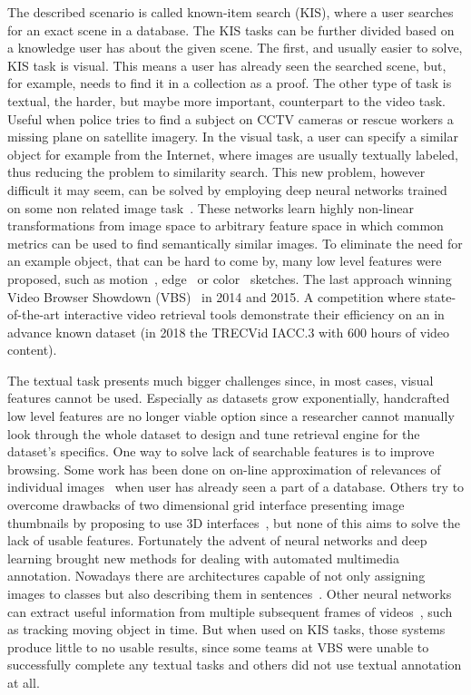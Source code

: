 The described scenario is called known-item search (KIS), where a user searches for an exact scene in a database. The KIS tasks can be further divided based on a knowledge user has about the given scene. The first, and usually easier to solve, KIS task is visual. This means a user has already seen the searched scene, but, for example, needs to find it in a collection as a proof. The other type of task is textual, the harder, but maybe more important, counterpart to the video task. Useful when police tries to find a subject on CCTV cameras or rescue workers a missing plane on satellite imagery. In the visual task, a user can specify a similar object for example from the Internet, where images are usually textually labeled, thus reducing the problem to similarity search. This new problem, however difficult it may seem, can be solved by employing deep neural networks trained on some non related image task~\cite{deepFeatures}. These networks learn highly non-linear transformations from image space to arbitrary feature space in which common metrics can be used to find semantically similar images.
To eliminate the need for an example object, that can be hard to come by, many low level features were proposed, such as motion~\cite{motionSketch}, edge~\cite{eitz2009descriptor} or color~\cite{sigBrowser} sketches. The last approach winning Video Browser Showdown (VBS)~\cite{cobarzan2017interactive} in 2014 and 2015. A competition where state-of-the-art interactive video retrieval tools demonstrate their efficiency on an in advance known dataset (in 2018 the TRECVid IACC.3 with 600 hours of video content).

The textual task presents much bigger challenges since, in most cases, visual features cannot be used. Especially as datasets grow exponentially, handcrafted low level features are no longer viable option since a researcher cannot manually look through the whole dataset to design and tune retrieval engine for the dataset's specifics. One way to solve lack of searchable features is to improve browsing. Some work has been done on on-line approximation of relevances of individual images~\cite{suditu2011heat} when user has already seen a part of a database. Others try to overcome drawbacks of two dimensional grid interface presenting image thumbnails by proposing to use 3D interfaces~\cite{schoeffmann20143}, but none of this aims to solve the lack of usable features. Fortunately the advent of neural networks and deep learning brought new methods for dealing with automated multimedia annotation. Nowadays there are architectures capable of not only assigning images to classes but also describing them in sentences~\cite{vinyals2017show}. Other neural networks can extract useful information from multiple subsequent frames of videos~\cite{bertinetto2016fully}, such as tracking moving object in time. But when used on KIS tasks, those systems produce little to no usable results, since some teams at VBS were unable to successfully complete any textual tasks  and others did not use textual annotation at all.

